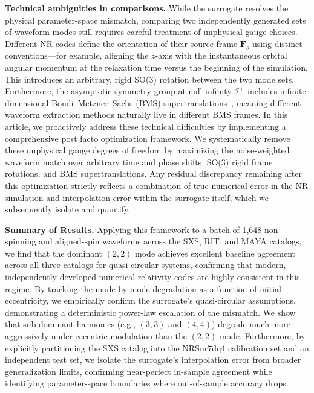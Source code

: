 \documentclass[%
 reprint,
superscriptaddress,
 amsmath,amssymb,
 aps,
]{revtex4-2}
\begin{document}
\textbf{Technical ambiguities in comparisons.} While the surrogate resolves the physical parameter-space mismatch, comparing two independently generated sets of waveform modes still requires careful treatment of unphysical gauge choices. Different NR codes define the orientation of their source frame $\mathbf{F}_s$ using distinct conventions—for example, aligning the $z$-axis with the instantaneous orbital angular momentum at the relaxation time versus the beginning of the simulation. This introduces an arbitrary, rigid SO(3) rotation between the two mode sets. Furthermore, the asymptotic symmetry group at null infinity $\mathcal{I}^+$ includes infinite-dimensional Bondi–Metzner–Sachs (BMS) supertranslations~\cite{Bondi:1962px, Sachs:1962wk, Mitman:2022kwt}, meaning different waveform extraction methods naturally live in different BMS frames. In this article, we proactively address these technical difficulties by implementing a comprehensive post facto optimization framework. We systematically remove these unphysical gauge degrees of freedom by maximizing the noise-weighted waveform match over arbitrary time and phase shifts, SO(3) rigid frame rotations, and BMS supertranslations. Any residual discrepancy remaining after this optimization strictly reflects a combination of true numerical error in the NR simulation and interpolation error within the surrogate itself, which we subsequently isolate and quantify.

\textbf{Summary of Results.} Applying this framework to a batch of 1,648 non-spinning and aligned-spin waveforms across the SXS, RIT, and MAYA catalogs, we find that the dominant $(2,2)$ mode achieves excellent baseline agreement across all three catalogs for quasi-circular systems, confirming that modern, independently developed numerical relativity codes are highly consistent in this regime. By tracking the mode-by-mode degradation as a function of initial eccentricity, we empirically confirm the surrogate's quasi-circular assumptions, demonstrating a deterministic power-law escalation of the mismatch. We show that sub-dominant harmonics (e.g., $(3,3)$ and $(4,4)$) degrade much more aggressively under eccentric modulation than the $(2,2)$ mode. Furthermore, by explicitly partitioning the SXS catalog into the NRSur7dq4 calibration set and an independent test set, we isolate the surrogate's interpolation error from broader generalization limits, confirming near-perfect in-sample agreement while identifying parameter-space boundaries where out-of-sample accuracy drops.
\end{document}
